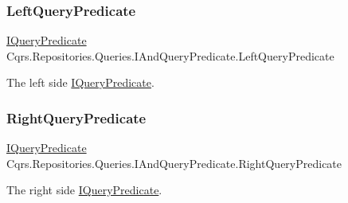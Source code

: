 \subsubsection{\texorpdfstring{Left\+Query\+Predicate}{LeftQueryPredicate}}
{\footnotesize\ttfamily \hyperlink{interfaceCqrs_1_1Repositories_1_1Queries_1_1IQueryPredicate}{I\+Query\+Predicate} Cqrs.\+Repositories.\+Queries.\+I\+And\+Query\+Predicate.\+Left\+Query\+Predicate\hspace{0.3cm}{\ttfamily [get]}}



The left side \hyperlink{interfaceCqrs_1_1Repositories_1_1Queries_1_1IQueryPredicate}{I\+Query\+Predicate}. 

\mbox{\label{interfaceCqrs_1_1Repositories_1_1Queries_1_1IAndQueryPredicate_ab24faa4c3423f91a8d9115b2cae6684b_ab24faa4c3423f91a8d9115b2cae6684b}} 
\subsubsection{\texorpdfstring{Right\+Query\+Predicate}{RightQueryPredicate}}
{\footnotesize\ttfamily \hyperlink{interfaceCqrs_1_1Repositories_1_1Queries_1_1IQueryPredicate}{I\+Query\+Predicate} Cqrs.\+Repositories.\+Queries.\+I\+And\+Query\+Predicate.\+Right\+Query\+Predicate\hspace{0.3cm}{\ttfamily [get]}}



The right side \hyperlink{interfaceCqrs_1_1Repositories_1_1Queries_1_1IQueryPredicate}{I\+Query\+Predicate}. 


